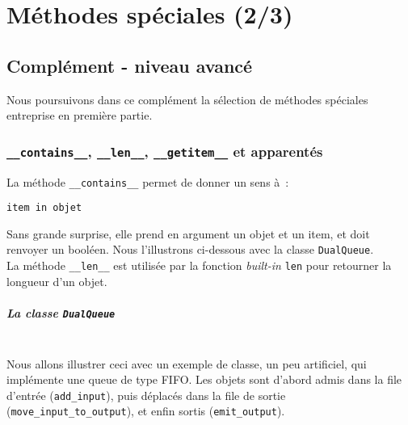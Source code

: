     \hypertarget{muxe9thodes-spuxe9ciales-23}{%
\section{Méthodes spéciales (2/3)}\label{muxe9thodes-spuxe9ciales-23}}

    \hypertarget{compluxe9ment---niveau-avancuxe9}{%
\subsection{Complément - niveau
avancé}\label{compluxe9ment---niveau-avancuxe9}}

    Nous poursuivons dans ce complément la sélection de méthodes spéciales
entreprise en première partie.


    \hypertarget{contains__-__len__-__getitem__-et-apparentuxe9s}{%
\subsubsection{\texorpdfstring{\texttt{\_\_contains\_\_},
\texttt{\_\_len\_\_}, \texttt{\_\_getitem\_\_} et
apparentés}{\_\_contains\_\_, \_\_len\_\_, \_\_getitem\_\_ et apparentés}}\label{contains__-__len__-__getitem__-et-apparentuxe9s}}

    La méthode \texttt{\_\_contains\_\_} permet de donner un sens à~:

\begin{verbatim}
item in objet
\end{verbatim}

Sans grande surprise, elle prend en argument un objet et un item, et
doit renvoyer un booléen. Nous l'illustrons ci-dessous avec la classe
\texttt{DualQueue}.\\

    La méthode \texttt{\_\_len\_\_} est utilisée par la fonction
\emph{built-in} \texttt{len} pour retourner la longueur d'un objet.

    \hypertarget{la-classe-dualqueue}{%
\subparagraph{\texorpdfstring{La classe
\texttt{DualQueue}}{La classe DualQueue}\\\\}\label{la-classe-dualqueue}}

    Nous allons illustrer ceci avec un exemple de classe, un peu artificiel,
qui implémente une queue de type FIFO. Les objets sont d'abord admis
dans la file d'entrée (\texttt{add\_input}), puis déplacés dans la file
de sortie (\texttt{move\_input\_to\_output}), et enfin sortis
(\texttt{emit\_output}).\\

